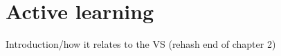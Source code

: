 \chapter{Active learning \label{ch:al}}

Introduction/how it relates to the VS (rehash end of chapter 2)



